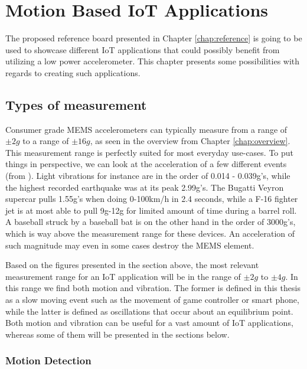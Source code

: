 \chapter{Motion Based IoT Applications}
\label{chap:applications}

The proposed reference board presented in Chapter \ref{chap:reference} is going to be used to showcase different IoT applications that could possibly benefit from utilizing a low power accelerometer. This chapter presents some possibilities with regards to creating such applications. 

\section{Types of measurement}

Consumer grade MEMS accelerometers can typically measure from a range of $\pm2g$ to a range of $\pm16g$, as seen in the overview from Chapter \ref{chap:overview}. This measurement range is perfectly suited for most everyday use-cases. To put things in perspective, we can look at the acceleration of a few different events (from \cite{g-force}). Light vibrations for instance are in the order of 0.014 - 0.039g's, while the highest recorded earthquake was at its peak 2.99g's. The Bugatti Veyron supercar pulls 1.55g's when doing 0-100km/h in 2.4 seconds, while a F-16 fighter jet is at most able to pull 9g-12g for limited amount of time during a barrel roll. A baseball struck by a baseball bat is on the other hand in the order of 3000g's, which is way above the measurement range for these devices. An acceleration of such magnitude may even in some cases destroy the MEMS element. 

Based on the figures presented in the section above, the most relevant measurement range for an IoT application will be in the range of $\pm2g$ to $\pm4g$. In this range we find both motion and vibration. The former is defined in this thesis as a slow moving event such as the movement of game controller or smart phone, while the latter is defined as oscillations that occur about an equilibrium point. Both motion and vibration can be useful for a vast amount of IoT applications, whereas some of them will be presented in the sections below. 

\subsection{Motion Detection}

